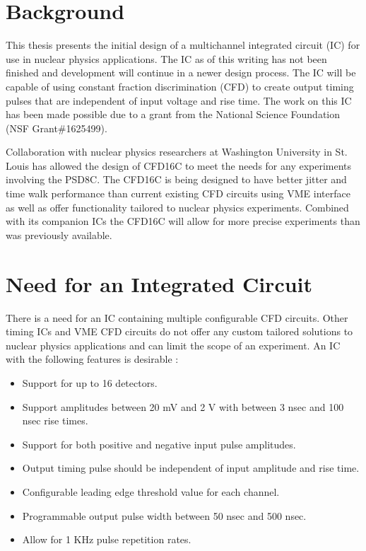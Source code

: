 \documentclass[12pt,oneside,final]{siuethesis}
\theoremstyle{definition}
\begin{document}
\section{Background}
\par This thesis presents the initial design of a multichannel integrated circuit (IC) for use in nuclear physics applications. The IC as of this writing has not been finished and development will continue in a newer design process. The IC will be capable of using constant fraction discrimination (CFD) to create output timing pulses that are independent of input voltage and rise time. The work on this IC has been made possible due to a grant from the National Science Foundation (NSF Grant\#1625499).
\par Collaboration with nuclear physics researchers at Washington University in St. Louis has allowed the design of CFD16C to meet the needs for any experiments involving the PSD8C. The CFD16C is being designed to have better jitter and time walk performance than current existing CFD circuits using VME interface as well as offer functionality tailored to nuclear physics experiments. Combined with its companion ICs the CFD16C will allow for more precise experiments than was previously available.

\section{Need for an Integrated Circuit}
\par There is a need for an IC containing multiple configurable CFD circuits. Other timing ICs and VME CFD circuits do not offer any custom tailored solutions to nuclear physics applications and can limit the scope of an experiment. An IC with the following features is desirable \cite{CFD}:

\begin{itemize}
\item 
Support for up to 16 detectors.
\item
Support amplitudes between 20 mV and 2 V  with between 3 nsec and 100 nsec rise times.
\item
Support for both positive and negative input pulse amplitudes.
\item
Output timing pulse should be independent of input amplitude and rise time.
\item
Configurable leading edge threshold value for each channel.
\item
Programmable output pulse width between 50 nsec and 500 nsec.
\item
Allow for 1 KHz pulse repetition rates.
\end{itemize}
\end{document}
